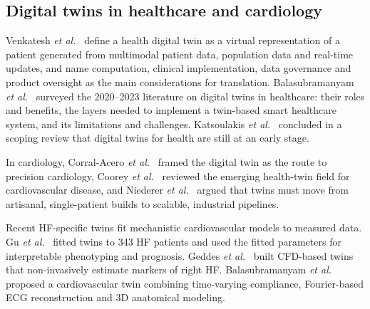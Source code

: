 \documentclass[conference]{IEEEtran}
\begin{document}
\subsection{Digital twins in healthcare and cardiology}\label{sec:rel-twins}
Venkatesh \textit{et al.}\ \cite{venkatesh2022hdt} define a health digital twin as a virtual representation of a patient generated from multimodal patient data, population data and real-time updates, and name computation, clinical implementation, data governance and product oversight as the main considerations for translation. Balasubramanyam \textit{et al.}\ \cite{balasubramanyam2024review} surveyed the 2020--2023 literature on digital twins in healthcare: their roles and benefits, the layers needed to implement a twin-based smart healthcare system, and its limitations and challenges. Katsoulakis \textit{et al.}\ \cite{katsoulakis2024dt4h} concluded in a scoping review that digital twins for health are still at an early stage.

In cardiology, Corral-Acero \textit{et al.}\ \cite{corral2020twin} framed the digital twin as the route to precision cardiology, Coorey \textit{et al.}\ \cite{coorey2022twin} reviewed the emerging health-twin field for cardiovascular disease, and Niederer \textit{et al.}\ \cite{niederer2021scaling} argued that twins must move from artisanal, single-patient builds to scalable, industrial pipelines.

Recent HF-specific twins fit mechanistic cardiovascular models to measured data. Gu \textit{et al.}\ \cite{gu2025hftwin} fitted twins to 343 HF patients and used the fitted parameters for interpretable phenotyping and prognosis. Geddes \textit{et al.}\ \cite{geddes2025rhftwin} built CFD-based twins that non-invasively estimate markers of right HF. Balasubramanyam \textit{et al.}\ \cite{balasubramanyam2025twin} proposed a cardiovascular twin combining time-varying compliance, Fourier-based ECG reconstruction and 3D anatomical modeling.
\end{document}
